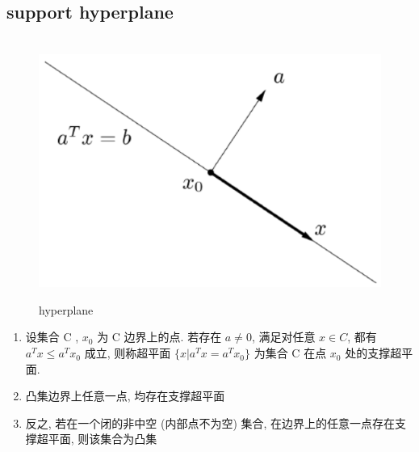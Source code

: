\documentclass[oneside, 12pt]{ctexbook}
\begin{document}
			\subsection{\quad support hyperplane}
				\begin{figure}[H]
					\vspace{-0.2cm}  %
					\setlength{\abovecaptionskip}{-0.2cm}   %
					\centering
					\includegraphics[scale=0.5]{hyperplane.png}
					\renewcommand{\figurename}{Fig} %
					\caption{hyperplane}
					\label{fig:5}
				\end{figure}
			
				\begin{enumerate}
					\item 设集合 C , $x_0$ 为 C 边界上的点. 若存在 $a \neq 0$, 满足对任意 $x \in C$, 都有 $a^T x \leq a^T x_0$ 成立, 则称超平面 $\{ x | a^T x = a^T x_0 \}$ 为集合 C 在点 $x_0$ 处的支撑超平面.
					
					\item 凸集边界上任意一点, 均存在支撑超平面
					
					\item 反之, 若在一个闭的非中空 (内部点不为空) 集合, 在边界上的任意一点存在支撑超平面, 则该集合为凸集
				\end{enumerate}
			
\end{document}
